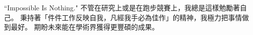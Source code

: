 \documentclass[10pt,a4paper]{article}
\begin{document}
``Impossible Is Nothing." 不管在研究上或是在跑步競賽上，我總是這樣勉勵著自己。
秉持著「件件工作反映自我，凡經我手必為佳作」的精神，我極力把事情做到最好。
期盼未來能在學術界獲得更豐碩的成果。




\begin{comment}
\section{參考文獻}
\label{sec:references}
\vspace{-1.0cm}
\begin{thebibliography}{50}


\end{thebibliography}
\end{comment}
\end{document}
